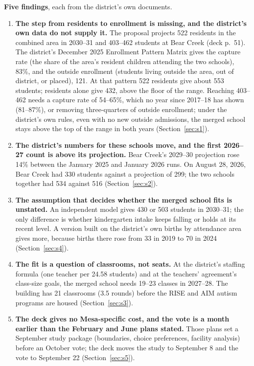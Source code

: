 \documentclass[11pt]{article}
\begin{document}
\noindent\textbf{Five findings}, each from the district's own documents.
\begin{enumerate}
\item \textbf{The step from residents to enrollment is missing, and the district's own data do not supply it.} The proposal projects 522 residents in the combined area in 2030--31 and 403--462 students at Bear Creek (deck p.\ 51). The district's December 2025 Enrollment Pattern Matrix gives the capture rate (the share of the area's resident children attending the two schools), 83\%, and the outside enrollment (students living outside the area, out of district, or placed), 121. At that pattern 522 residents give about 553 students; residents alone give 432, above the floor of the range. Reaching 403--462 needs a capture rate of 54--65\%, which no year since 2017--18 has shown (81--87\%), or removing three-quarters of outside enrollment; under the district's own rules, even with no new outside admissions, the merged school stays above the top of the range in both years (Section~\ref{sec:s1}).
\item \textbf{The district's numbers for these schools move, and the first 2026--27 count is above its projection.} Bear Creek's 2029--30 projection rose 14\% between the January 2025 and January 2026 runs. On August 28, 2026, Bear Creek had 330 students against a projection of 299; the two schools together had 534 against 516 (Section~\ref{sec:s2}).
\item \textbf{The assumption that decides whether the merged school fits is unstated.} An independent model gives 430 or 503 students in 2030--31; the only difference is whether kindergarten intake keeps falling or holds at its recent level. A version built on the district's own births by attendance area gives more, because births there rose from 33 in 2019 to 70 in 2024 (Section~\ref{sec:s4}).
\item \textbf{The fit is a question of classrooms, not seats.} At the district's staffing formula (one teacher per 24.58 students) and at the teachers' agreement's class-size goals, the merged school needs 19--23 classes in 2027--28. The building has 21 classrooms (3.5 rounds) before the RISE and AIM autism programs are housed (Section~\ref{sec:s3}).
\item \textbf{The deck gives no Mesa-specific cost, and the vote is a month earlier than the February and June plans stated.} Those plans set a September study package (boundaries, choice preferences, facility analysis) before an October vote; the deck moves the study to September 8 and the vote to September 22 (Section~\ref{sec:s5}).
\end{enumerate}
\end{document}
